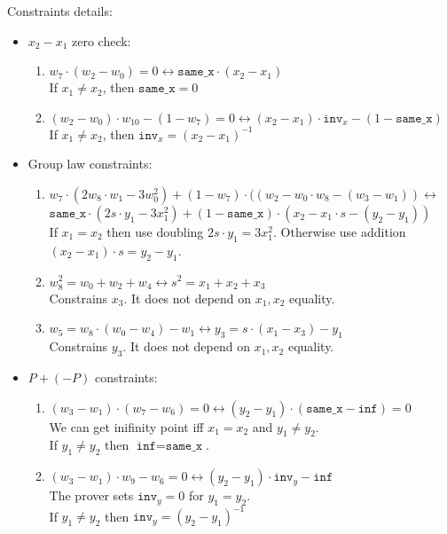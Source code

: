Constraints details:
\begin{itemize}
	 \item $x_2 - x_1$ zero check:
	 \begin{enumerate}
		 	\item $w_7 \cdot (w_2 - w_0) = 0 \longleftrightarrow 
		 			\texttt{same\_x} \cdot (x_2 -x_1)$ \\
		 		If $x_1 \neq x_2$, then $\texttt{same\_x} = 0$
		    \item $(w_2 - w_0) \cdot w_{10} - (1 - w_7) = 0 \longleftrightarrow 
		    		(x_2 - x_1) \cdot \texttt{inv}_x - (1 - \texttt{same\_x})$ \\
		    	If $x_1 \neq x_2$, then $\texttt{inv}_x = (x_2 - x_1)^{-1}$
	 \end{enumerate}
	 \item Group law constraints:
	 \begin{enumerate}
	 	\item $w_7 \cdot (2w_8 \cdot w_1 - 3w_0^2) + (1 - w_7) \cdot ((w_2 - w_0 \cdot w_8 - (w_3 - w_1)) \longleftrightarrow$ \\
			  $\texttt{same\_x} \cdot (2s \cdot y_1 - 3x_1^2) + (1 - \texttt{same\_x}) \cdot (x_2 - x_1 \cdot s - (y_2 - y_1))$ \\
			If $x_1 = x_2$ then use doubling $2s \cdot y_1 = 3x_1^2$. Otherwise use addition $(x_2 - x_1) \cdot s = y_2 - y_1$.
	 	\item $w_8^2 = w_0 + w_2 + w_4 \longleftrightarrow 
	 			s^2 = x_1 + x_2 + x_3$ \\
	 		Constrains $x_3$. It does not depend on $x_1, x_2$ equality.
	 	\item $w_5 = w_8 \cdot (w_0 - w_4) - w_1 \longleftrightarrow 
	 			y_3 = s \cdot (x_1 - x_3) - y_1$ \\
	 		Constrains $y_3$. It does not depend on $x_1, x_2$ equality.
	 \end{enumerate}
	 \item $P + (-P)$ constraints:
	 \begin{enumerate}
		 \item $(w_3 - w_1) \cdot (w_7 - w_6) = 0 \longleftrightarrow 
	    			(y_2 - y_1) \cdot (\texttt{same\_x} - \texttt{inf}) = 0$ \\ 
	    	We can get inifinity point iff $x_1 = x_2$ and $y_1 \neq y_2$. \\
	    	If $y_1 \neq y_2$ then $\texttt{inf} = \texttt{same\_x}$.
	    \item $(w_3 - w_1) \cdot w_9 - w_6 = 0 \longleftrightarrow 
	    			(y_2 - y_1) \cdot \texttt{inv}_y - \texttt{inf}$ \\
	    	The prover sets $\texttt{inv}_y = 0$ for $y_1 = y_2$. \\
	    	If $y_1 \neq y_2$ then $\texttt{inv}_y = (y_2 - y_1)^{-1}$
	 \end{enumerate}
\end{itemize}

